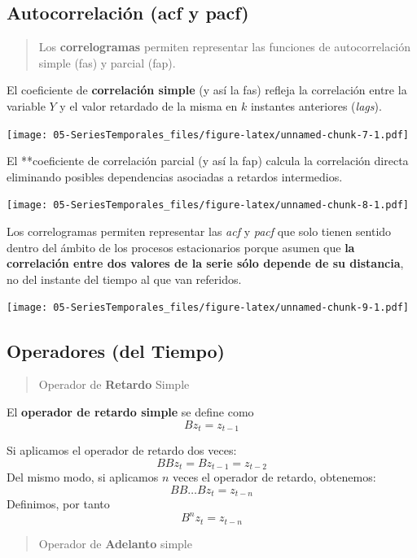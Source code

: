\documentclass[]{book}
\begin{document}
\hypertarget{autocorrelacion-acf-y-pacf}{%
\subsection{Autocorrelación (acf y pacf)}\label{autocorrelacion-acf-y-pacf}}

\begin{quote}
Los \textbf{correlogramas} permiten representar las funciones de autocorrelación simple (fas) y parcial (fap).
\end{quote}

El coeficiente de \textbf{correlación simple} (y así la fas) refleja la correlación entre la variable \(Y\) y el valor retardado de la misma en \(k\) instantes anteriores (\emph{lags}).

\texttt{[image: 05-SeriesTemporales\_files/figure-latex/unnamed-chunk-7-1.pdf]}

El **coeficiente de correlación parcial (y así la fap) calcula la correlación directa eliminando posibles dependencias asociadas a retardos intermedios.

\texttt{[image: 05-SeriesTemporales\_files/figure-latex/unnamed-chunk-8-1.pdf]}

Los correlogramas permiten representar las \emph{acf} y \emph{pacf} que solo tienen sentido dentro del ámbito de los procesos estacionarios porque asumen que \textbf{la correlación entre dos valores de la serie sólo depende de su distancia}, no del instante del tiempo al que van referidos.

\texttt{[image: 05-SeriesTemporales\_files/figure-latex/unnamed-chunk-9-1.pdf]}

\hypertarget{operadores-del-tiempo}{%
\subsection{Operadores (del Tiempo)}\label{operadores-del-tiempo}}

\begin{quote}
Operador de \textbf{Retardo} Simple
\end{quote}

El \textbf{operador de retardo simple} se define como
\[Bz_t=z_{t-1}\]

Si aplicamos el operador de retardo dos veces:
\[BBz_t=Bz_{t-1}=z_{t-2}\]
Del mismo modo, si aplicamos \(n\) veces el operador de retardo, obtenemos:
\[ BB \ldots Bz_t=z_{t-n} \]
Definimos, por tanto
\[ B^n z_t=z_{t-n} \]

\begin{quote}
Operador de \textbf{Adelanto} simple
\end{quote}
\end{document}
